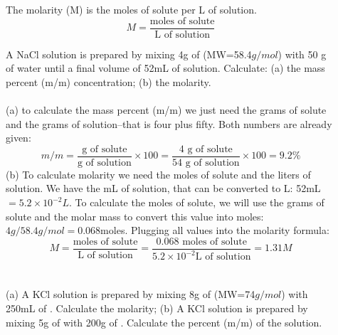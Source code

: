 \documentclass[main.tex]{subfiles} %
\begin{document}
\begin{description}
\item[] The molarity (M) is the moles of solute per L of solution.
\begin{equation*}
\boxed{ M=\frac{\text{moles of solute}}{\text{L of solution}}}   
\end{equation*}
\begin{example} %
A NaCl solution is prepared by mixing 4g of  (MW=58.4$g/mol$) with 50 g of water until a final volume of 52mL of solution. Calculate:  (a) the mass percent (m/m) concentration; (b) the molarity.
\\
\\
(a) to calculate the mass percent (m/m) we just need the grams of solute and the grams of solution--that is four plus fifty. Both numbers are already given:
\begin{equation*}
 m/m=\frac{\text{g of solute}}{\text{g of solution}}\times 100 =\frac{\text{4 g of solute}}{\text{54 g of solution}}\times 100=9.2\%
\end{equation*}
(b) To calculate molarity we need the moles of solute and the liters of solution. We have the mL of solution, that can be converted to L: 52mL$=5.2\times 10^{-2}L$. To calculate the moles of solute, we will use the grams of solute and the molar mass to convert this value into moles: $4g/58.4 g/mol=$0.068moles. Plugging all values into the molarity formula:
\begin{equation*}
M=\frac{\text{moles of solute}}{\text{L of solution}}
=\frac{\text{0.068 moles of solute}}{5.2\times 10^{-2}\text{L of solution}}=1.31M
\end{equation*}
\\
\faDiamond\ \\
(a) A KCl solution is prepared by mixing 8g of  (MW=74$g/mol$) with 250mL of . Calculate the molarity; (b) A KCl solution is prepared by mixing 5g of  with 200g of . Calculate the percent (m/m) of the solution.
\\
\end{example}%


\end{description}
\end{document}
